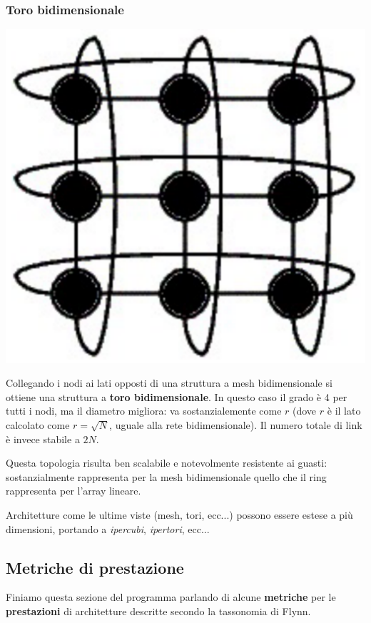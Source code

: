 \documentclass[a4paper,11pt]{article}
\begin{document}
\subsubsection{Toro bidimensionale}
\begin{center}
	\includegraphics[scale=0.1]{../figures/torus.png}
\end{center}
Collegando i nodi ai lati opposti di una struttura a mesh bidimensionale si ottiene una struttura a \textbf{toro bidimensionale}.
In questo caso il grado è 4 per tutti i nodi, ma il diametro migliora: va sostanzialemente come $r$ (dove $r$ è il lato calcolato come $r = \sqrt{N}$, uguale alla rete bidimensionale).
Il numero totale di link è invece stabile a $2N$.

Questa topologia risulta ben scalabile e notevolmente resistente ai guasti: sostanzialmente rappresenta per la mesh bidimensionale quello che il ring rappresenta per l'array lineare.

\par\medskip

Architetture come le ultime viste (mesh, tori, ecc...) possono essere estese a più dimensioni, portando a \textit{ipercubi}, \textit{ipertori}, ecc... 

\subsection{Metriche di prestazione}
Finiamo questa sezione del programma parlando di alcune \textbf{metriche} per le \textbf{prestazioni} di architetture descritte secondo la tassonomia di Flynn.
\end{document}
